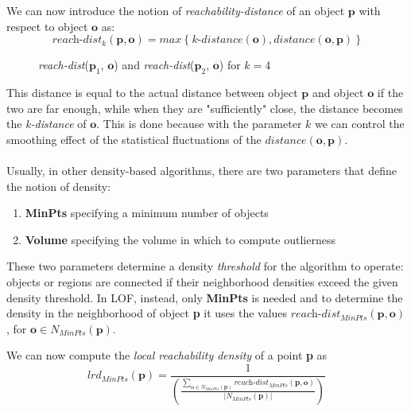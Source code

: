 We can now introduce the notion of \textit{reachability-distance} of an object $\textbf{p}$ with respect to object $\textbf{o}$ as:
\begin{equation}
    \textit{reach-dist}_k(\textbf{p}, \textbf{o}) = max\ \{\ \textit{k-distance}(\textbf{o}), distance(\textbf{o}, \textbf{p})\ \}
\end{equation}

\begin{figure}[b]
    \centering
    
    \caption{\textit{reach-dist}($\textbf{p}_1$, $\textbf{o}$) and \textit{reach-dist}($\textbf{p}_2$, $\textbf{o}$) for $k=4$}
    \label{fig:lof_kdist}
\end{figure}

This distance is equal to the actual distance between object $\textbf{p}$ and object $\textbf{o}$ if the two are far enough, while when they are "sufficiently" close, the distance becomes the \textit{k-distance} of $\textbf{o}$. This is done because with the parameter $k$ we can control the smoothing effect of the statistical fluctuations of the $distance(\textbf{o}, \textbf{p})$. 

\paragraph{}
Usually, in other density-based algorithms, there are two parameters that define the notion of density:
\begin{enumerate}[label=(\roman*)]
    \item \textbf{MinPts} specifying a minimum number of objects
    \item \textbf{Volume} specifying the volume in which to compute outlierness
\end{enumerate}
These two parameters determine a density \textit{threshold} for the algorithm to operate: objects or regions are connected if their neighborhood densities exceed the given density threshold. \newline
In LOF, instead, only \textbf{MinPts} is needed and to determine the density in the neighborhood of object \textbf{p} it uses the values $\textit{reach-dist}_{MinPts}(\textbf{p}, \textbf{o})$, for $\textbf{o} \in N_{MinPts}(\textbf{p})$.

We can now compute the \textit{local reachability density} of a point \textbf{p} as
\begin{equation}
    lrd_{MinPts}(\textbf{p}) = \frac{1}{
    \displaystyle \left ( \frac{\sum\limits_{\textbf{o} \in N_{MinPts}(\textbf{p}) } \textit{reach-dist}_{MinPts}(\textbf{p}, \textbf{o})}
    {|N_{MinPts}(\textbf{p}) |} \right ) }
\end{equation}

